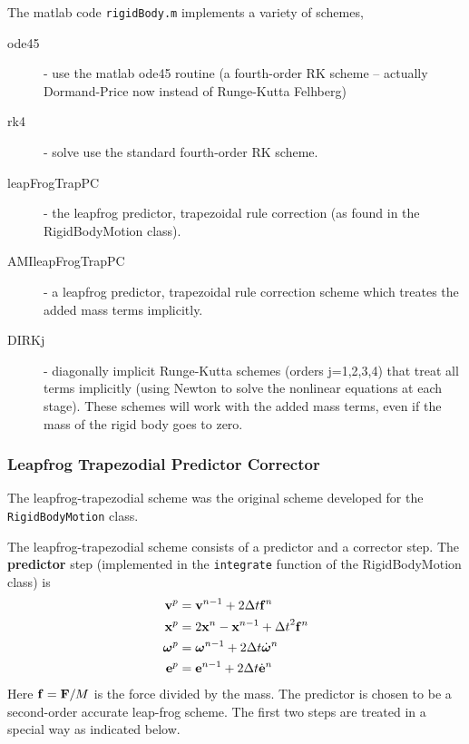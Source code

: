 The matlab code {\tt rigidBody.m} implements a variety of schemes,
\begin{description}
  \item [ode45] - use the matlab ode45 routine (a fourth-order RK scheme -- actually Dormand-Price now instead of Runge-Kutta Felhberg)
  \item[rk4] - solve use the standard fourth-order RK scheme.
  \item[leapFrogTrapPC] - the leapfrog predictor, trapezoidal rule correction (as found in the RigidBodyMotion class).
  \item[AMIleapFrogTrapPC] - a leapfrog predictor, trapezoidal rule correction scheme which treates the added mass
               terms implicitly.
  \item[DIRKj] - diagonally implicit Runge-Kutta schemes (orders j=1,2,3,4) that treat all terms implicitly (using Newton
         to solve the nonlinear equations at each stage). These schemes will work with the added mass terms, 
         even if the mass of the rigid body goes to zero.
\end{description}




\subsubsection{Leapfrog Trapezodial Predictor Corrector} \label{sec:leapFrogTrap}

The leapfrog-trapezodial scheme was the original scheme developed for the {\tt RigidBodyMotion} class.


The leapfrog-trapezodial scheme  consists of a predictor and a corrector step.
The {\bf predictor} step (implemented in the {\tt integrate} function of the RigidBodyMotion class)
is
\begin{align*}
    \mathbf{ v}^p &= \mathbf{ v}^{n-1} + 2{\Delta t} \mathbf{ f}^n \\
    \mathbf{ x}^p &= 2 \mathbf{ x}^n - \mathbf{ x}^{n-1} + {\Delta t}^2 \mathbf{ f}^n \\   
    \boldsymbol{\omega}^p &= \boldsymbol{\omega}^{n-1} + 2{\Delta t} \dot{\boldsymbol{\omega}}^n \\
    \mathbf{ e}^p &= \mathbf{ e}^{n-1} + 2{\Delta t} \dot{\mathbf{ e}}^n
\end{align*}
Here $\mathbf{ f}= \mathbf{ F}/M$ is the force divided by the mass. The predictor is chosen to be a second-order
accurate leap-frog scheme.
The first two steps are treated in a special way as indicated below.

